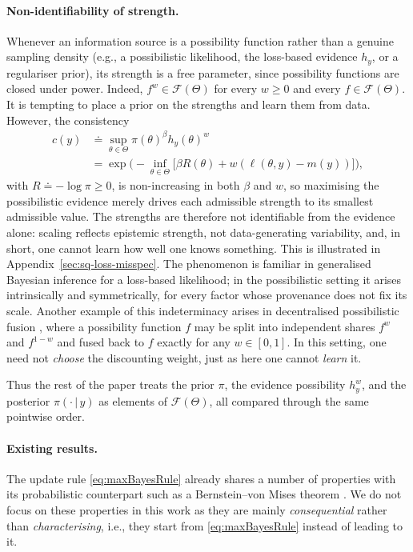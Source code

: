 \documentclass[accepted]{uai2026} %
\def\given{\,|\,}
\theoremstyle{remark}
\begin{document}
\paragraph{Non-identifiability of strength.}
Whenever an information source is a possibility function rather than a genuine sampling density (e.g., a possibilistic likelihood, the loss-based evidence $h_y$, or a regulariser prior), its strength is a free parameter, since possibility functions are closed under power. Indeed, $f^{w}\in\mathcal F(\Theta)$ for every $w\ge0$ and every $f\in\mathcal F(\Theta)$. It is tempting to place a prior on the strengths and learn them from data. However, the consistency
\begin{align*}
    c(y) & \doteq \sup_{\theta\in\Theta}\pi(\theta)^{\beta} h_y(\theta)^{w} \\
    & = \exp\Big(-\inf_{\theta\in\Theta}
      \big[\beta R(\theta)+w(\ell(\theta,y)-m(y))\big]\Big),
\end{align*}
with $R\doteq-\log\pi\ge0$, is non-increasing in both $\beta$ and $w$, so maximising the possibilistic evidence merely drives each admissible strength to its smallest admissible value. The strengths are therefore not identifiable from the evidence alone: scaling reflects epistemic strength, not data-generating variability, and, in short, one cannot learn how well one knows something. This is illustrated in Appendix~\ref{sec:sq-loss-misspec}. The phenomenon is familiar in generalised Bayesian inference \citep{bissiri2016general} for a loss-based likelihood; in the possibilistic setting it arises intrinsically and symmetrically, for every factor whose provenance does not fix its scale. Another example of this indeterminacy arises in decentralised possibilistic fusion \citep{houssineau2026decentralised}, where a possibility function $f$ may be split into independent shares $f^{w}$ and $f^{1-w}$ and fused back to $f$ exactly for any $w\in[0,1]$. In this setting, one need not \emph{choose} the discounting weight, just as here one cannot \emph{learn} it.

Thus the rest of the paper treats the prior $\pi$, the evidence possibility $h_y^w$, and the posterior $\pi(\cdot\given y)$ as elements of $\mathcal F(\Theta)$, all compared through the same pointwise order.

\paragraph{Existing results.} The update rule \eqref{eq:maxBayesRule} already shares a number of properties with its probabilistic counterpart such as a Bernstein--von Mises theorem \citep{hieu2025decoupling}. We do not focus on these properties in this work as they are mainly \emph{consequential} rather than \emph{characterising}, i.e., they start from \eqref{eq:maxBayesRule} instead of leading to it.
\end{document}
